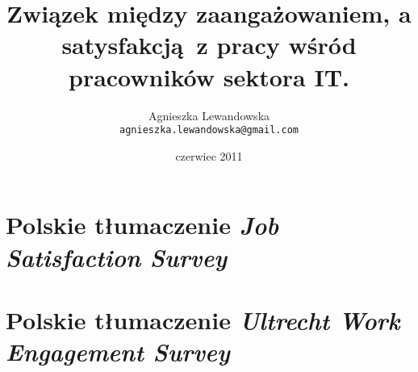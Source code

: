 \documentclass[a4paper,11pt,titlepage]{article}
\begin{document}
\title{Związek między zaangażowaniem, a satysfakcją~z pracy wśród pracowników sektora IT.}
\author{\Large{Agnieszka Lewandowska} \\ \texttt{agnieszka.lewandowska@gmail.com} }
\date{czerwiec 2011}
\maketitle


\tableofcontents
\cleardoublepage







\graphicspath{{img/group/}}

\graphicspath{{img/results/}}



\cleardoublepage
\appendix
\section{Polskie tłumaczenie \emph{Job Satisfaction Survey}}
\section{Polskie tłumaczenie \emph{Ultrecht Work Engagement Survey}}
\end{document}

